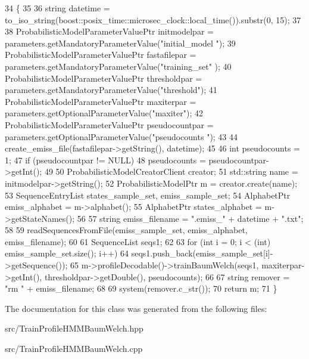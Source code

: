 \begin{DoxyCode}
34                                                                                                       \{
35 
36     \textcolor{keywordtype}{string} datetime = to\_iso\_string(boost::posix\_time::microsec\_clock::local\_time()).substr(0, 15);
37 
38     ProbabilisticModelParameterValuePtr initmodelpar = parameters.getMandatoryParameterValue(\textcolor{stringliteral}{"initial\_model
      "});
39     ProbabilisticModelParameterValuePtr fastafilepar = parameters.getMandatoryParameterValue(\textcolor{stringliteral}{"training\_set"}
      );
40     ProbabilisticModelParameterValuePtr thresholdpar = parameters.getMandatoryParameterValue(\textcolor{stringliteral}{"threshold"});
41     ProbabilisticModelParameterValuePtr maxiterpar = parameters.getOptionalParameterValue(\textcolor{stringliteral}{"maxiter"});
42     ProbabilisticModelParameterValuePtr pseudocountpar = parameters.getOptionalParameterValue(\textcolor{stringliteral}{"pseudocounts
      "});
43 
44     create\_emiss\_file(fastafilepar->getString(), datetime);
45 
46     \textcolor{keywordtype}{int} pseudocounts = 1;
47     \textcolor{keywordflow}{if} (pseudocountpar != NULL)
48         pseudocounts = pseudocountpar->getInt();
49 
50     ProbabilisticModelCreatorClient creator;
51     std::string name = initmodelpar->getString();
52     ProbabilisticModelPtr m = creator.create(name);
53     SequenceEntryList states\_sample\_set, emiss\_sample\_set;
54     AlphabetPtr emiss\_alphabet = m->alphabet();
55     AlphabetPtr states\_alphabet = m->getStateNames();
56 
57     \textcolor{keywordtype}{string} emiss\_filename = \textcolor{stringliteral}{".emiss\_"} + datetime + \textcolor{stringliteral}{".txt"};
58 
59     readSequencesFromFile(emiss\_sample\_set, emiss\_alphabet, emiss\_filename);
60 
61     SequenceList seqs1;
62 
63     \textcolor{keywordflow}{for} (\textcolor{keywordtype}{int} i = 0; i < (int) emiss\_sample\_set.size(); i++)
64         seqs1.push\_back(emiss\_sample\_set[i]->getSequence());
65     m->profileDecodable()->trainBaumWelch(seqs1, maxiterpar->getInt(), thresholdpar->getDouble(), 
      pseudocounts);
66 
67     \textcolor{keywordtype}{string} remover = \textcolor{stringliteral}{"rm "} + emiss\_filename;
68 
69     system(remover.c\_str());
70     \textcolor{keywordflow}{return} m;
71 \}
\end{DoxyCode}


The documentation for this class was generated from the following files\+:\begin{DoxyCompactItemize}
\item 
src/Train\+Profile\+H\+M\+M\+Baum\+Welch.\+hpp\item 
src/Train\+Profile\+H\+M\+M\+Baum\+Welch.\+cpp\end{DoxyCompactItemize}
